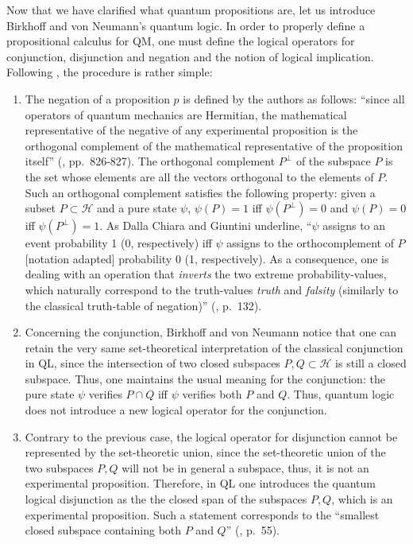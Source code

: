 \documentclass[11pt, executivepaper]{article}
\begin{document}
Now that we have clarified what quantum propositions are, let us introduce Birkhoff and von Neumann's quantum logic. In order to properly define a propositional calculus for QM, one must define the logical operators for conjunction, disjunction and negation and the notion of logical implication. Following \cite{vonNeumann:1936}, the procedure is rather simple: 
\begin{enumerate}
\item The negation of a proposition $p$ is defined by the authors as follows: ``since all operators of quantum mechanics are Hermitian, the mathematical representative of the negative of any experimental proposition is the orthogonal complement of the mathematical representative of the proposition itself'' (\cite{vonNeumann:1936}, pp.\ 826-827). The orthogonal complement $P^{\perp}$ of the subspace $P$ is the set whose elements are all the vectors orthogonal to the elements of $P$. Such an orthogonal complement satisfies the following property: given a subset $P\subset\mathcal{H}$ and a pure state $\psi$, $\psi(P)=1$ iff $\psi(P^{\perp})=0$ and $\psi(P)=0$ iff $\psi(P^{\perp})=1$. As Dalla Chiara and Giuntini underline, ``$\psi$ assigns to an event probability 1 (0, respectively) iff $\psi$ assigns to the orthocomplement of $P$ [notation adapted] probability 0 (1, respectively). As a consequence, one is dealing with an operation that \emph{inverts} the two extreme probability-values, which naturally correspond to the truth-values \emph{truth} and \emph{falsity} (similarly to the classical truth-table of negation)'' (\cite{Giuntini:2002}, p.\ 132).
\item Concerning the conjunction, Birkhoff and von Neumann notice that one can retain the very same set-theoretical interpretation of the classical conjunction in QL, since the intersection of two closed subspaces $P, Q\subset\mathcal{H}$ is still a closed subspace. Thus, one maintains the usual meaning for the conjunction: the pure state $\psi$ verifies $P\cap Q$ iff $\psi$ verifies both $P$ and $Q$. Thus, quantum logic does not introduce a new logical operator for the conjunction.
\item Contrary to the previous case, the logical operator for disjunction cannot be represented by the set-theoretic union, since the set-theoretic union of the two subspaces $P, Q$ will not be in general a subspace, thus, it is not an experimental proposition. Therefore, in QL one introduces the quantum logical disjunction as the the closed span of the subspaces $P, Q$, which is an experimental proposition. Such a statement corresponds to the ``smallest closed subspace containing both $P$ and $Q$'' (\cite{Bacciagaluppi:2009}, p.\ 55). 

\end{enumerate}
\end{document}
